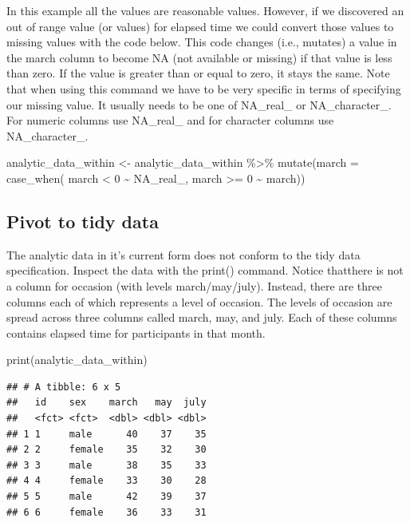 \documentclass[
]{krantz}
\makeatletter
\newenvironment{Shaded}{\begin{snugshade}}{\end{snugshade}}
\newcommand{\AttributeTok}[1]{\textcolor[rgb]{0.61,0.61,0.61}{#1}}
\newcommand{\ConstantTok}[1]{\textcolor[rgb]{0,0,0}{#1}}
\newcommand{\DecValTok}[1]{\textcolor[rgb]{0.06,0.06,0.06}{#1}}
\newcommand{\FunctionTok}[1]{\textcolor[rgb]{0,0,0}{#1}}
\newcommand{\NormalTok}[1]{#1}
\newcommand{\OtherTok}[1]{\textcolor[rgb]{0.37,0.37,0.37}{#1}}
\newcommand{\SpecialCharTok}[1]{\textcolor[rgb]{0,0,0}{#1}}
\newenvironment{kframe}{%
\medskip{}
\setlength{\fboxsep}{.8em}
 \def\at@end@of@kframe{}%
 \ifinner\ifhmode%
  \def\at@end@of@kframe{\end{minipage}}%
  \begin{minipage}{\columnwidth}%
 \fi\fi%
 \def\FrameCommand##1{\hskip\@totalleftmargin \hskip-\fboxsep
 \colorbox{shadecolor}{##1}\hskip-\fboxsep
     \hskip-\linewidth \hskip-\@totalleftmargin \hskip\columnwidth}%
 \MakeFramed {\advance\hsize-\width
   \@totalleftmargin\z@ \linewidth\hsize
   \@setminipage}}%
 {\par\unskip\endMakeFramed%
 \at@end@of@kframe}
\renewenvironment{Shaded}{\begin{kframe}}{\end{kframe}}
\makeatother
\begin{document}
In this example all the values are reasonable values. However, if we discovered an out of range value (or values) for elapsed time we could convert those values to missing values with the code below. This code changes (i.e., mutates) a value in the march column to become NA (not available or missing) if that value is less than zero. If the value is greater than or equal to zero, it stays the same. Note that when using this command we have to be very specific in terms of specifying our missing value. It usually needs to be one of NA\_real\_ or NA\_character\_. For numeric columns use NA\_real\_ and for character columns use NA\_character\_.

\begin{Shaded}
\begin{Highlighting}[]
\NormalTok{analytic\_data\_within }\OtherTok{\textless{}{-}}\NormalTok{ analytic\_data\_within  }\SpecialCharTok{\%\textgreater{}\%} 
    \FunctionTok{mutate}\NormalTok{(}\AttributeTok{march =} \FunctionTok{case\_when}\NormalTok{(}
\NormalTok{      march }\SpecialCharTok{\textless{}} \DecValTok{0} \SpecialCharTok{\textasciitilde{}} \ConstantTok{NA\_real\_}\NormalTok{,}
\NormalTok{      march }\SpecialCharTok{\textgreater{}=} \DecValTok{0} \SpecialCharTok{\textasciitilde{}}\NormalTok{ march))}
\end{Highlighting}
\end{Shaded}

\hypertarget{pivot-to-tidy-data}{%
\subsection{Pivot to tidy data}\label{pivot-to-tidy-data}}

The analytic data in it's current form does not conform to the tidy data specification. Inspect the data with the print() command. Notice thatthere is not a column for occasion (with levels march/may/july). Instead, there are three columns each of which represents a level of occasion. The levels of occasion are spread across three columns called march, may, and july. Each of these columns contains elapsed time for participants in that month.

\begin{Shaded}
\begin{Highlighting}[]
\FunctionTok{print}\NormalTok{(analytic\_data\_within)}
\end{Highlighting}
\end{Shaded}

\begin{verbatim}
## # A tibble: 6 x 5
##   id    sex    march   may  july
##   <fct> <fct>  <dbl> <dbl> <dbl>
## 1 1     male      40    37    35
## 2 2     female    35    32    30
## 3 3     male      38    35    33
## 4 4     female    33    30    28
## 5 5     male      42    39    37
## 6 6     female    36    33    31
\end{verbatim}
\end{document}
